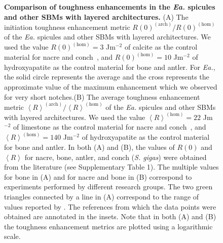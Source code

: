 \documentclass[12pt,onecolumn]{article}
\makeatletter
\newcommand{\EA}{\textit{Ea.\@}\xspace}
\makeatother
\begin{document}
\begin{bibunit}
\begin{figure}[ht!]
{			\textbf{Comparison of toughness enhancements in the \EA spicules and other SBMs with layered architectures.} (A)  The initiation toughness enhancement metric $R(0)^{(\mathrm{arch})}/R(0)^{(\mathrm{hom})}$ of the \EA spicules and other SBMs with layered architectures. We used the value $R(0)^{(\mathrm{hom})}=3$ Jm$^{-2}$ of calcite as the control material for nacre and conch~\cite{wegst2004mechanical}, and $R(0)^{(\mathrm{hom})}=10$ Jm$^{-2}$ of hydroxyapatite \cite{wegst2004mechanical} as the control material for bone and antler. For \EA, the solid circle represents the average and the cross represents the approximate value of the maximum enhancement which we observed for very short notches.(B) The average toughness enhancement metric $\left< R\right>^{(\mathrm{arch})}/\left< R\right>^{(\mathrm{hom})}$ of the \EA spicules and other SBMs with layered architectures. We used the value $\left< R\right>^{(\mathrm{hom})}=22$ Jm$^{-2}$ of limestone as the control material for nacre and conch~\cite{carmichael1982crc}, and $\left< R\right>^{(\mathrm{hom})}=140$ Jm$^{-2}$ of hydroxyapatite \cite{tenhuisen1995formation} as the control material for bone and antler. In both (A) and (B), the values of $R(0)$ and $\left< R \right>$ for nacre, bone, antler, and conch (\textit{S. gigas}) were obtained from the literature (see Supplementary Table 1). The multiple values for bone in (A) and for nacre and bone in (B) correspond to experiments performed by different research groups. The two green triangles connected by a line in (A) correspond to the range of values reported by \cite{koester2008true}. The references from which the data points were obtained are annotated in the insets. Note that in both (A) and (B) the toughness enhancement metrics are plotted using a logarithmic scale.
			}
			\label{fig:SBMcomp}
			\end{figure}


\end{bibunit}
\end{document}
